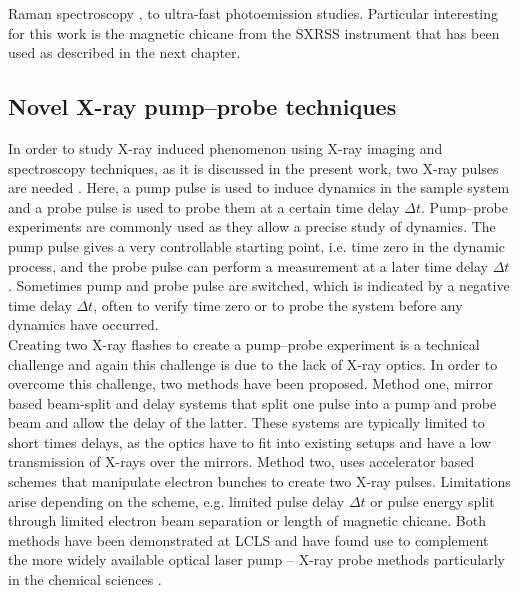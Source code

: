 Raman spectroscopy \citep{Kimberg-2016-FD}, to ultra-fast photoemission studies. Particular interesting for this work is the magnetic chicane from the SXRSS instrument that has been used as described in the next chapter.
%
%
%
%
\subsection{Novel X-ray pump–probe techniques}
In order to study X-ray induced phenomenon using X-ray imaging and spectroscopy techniques, as it is discussed in the present work, two X-ray pulses are needed . Here, a pump pulse is used to induce dynamics in the sample system and a probe pulse is used to probe them at a certain time delay $\Delta t$. Pump--probe experiments are commonly used as they allow a precise study of dynamics. The pump pulse gives a very controllable starting point, i.e. time zero in the dynamic process, and the probe pulse can perform a measurement at a later time delay $\Delta t$. Sometimes pump and probe pulse are switched, which is indicated by a negative time delay $\Delta t$, often to verify time zero or to probe the system before any dynamics have occurred.\\
Creating two X-ray flashes to create a pump--probe experiment is a technical challenge and again this challenge is due to the lack of X-ray optics. In order to overcome this challenge, two methods have been proposed. Method one, mirror based beam-split and delay systems \citep{Castagna-2013-JPCS,Murphy-2012-SPIE} that split one pulse into a pump and probe beam and allow the delay of the latter. These systems are typically limited to short times delays, as the optics have to fit into existing setups and have a low transmission of X-rays over the mirrors. Method two, uses accelerator based schemes \citep{Lutman-2013-PRL,Marinelli-2015-NatComm} that manipulate electron bunches to create two X-ray pulses. Limitations arise depending on the scheme, e.g. limited pulse delay $\Delta t$ or pulse energy split through limited electron beam separation or length of magnetic chicane. Both methods have been demonstrated at LCLS and have found use to complement the more widely available optical laser pump -- X-ray probe methods particularly in the chemical sciences \cite{Picon-2016-NatComm,Ferguson-2016-SciAdv,Liekhus-Schmaltz-2015-NatComm}.\\
